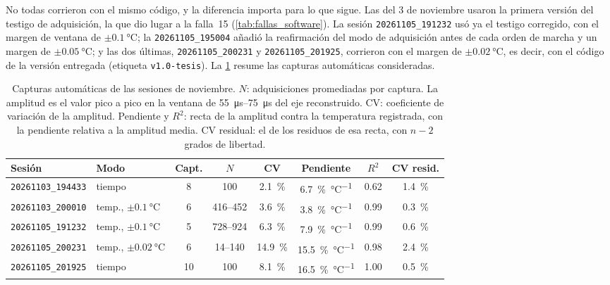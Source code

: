 No todas corrieron con el mismo código, y la diferencia importa para
lo que sigue. Las del 3 de noviembre usaron la primera versión del
testigo de adquisición, la que dio lugar a la falla~15
(\cref{tab:fallas_software}). La sesión \texttt{20261105\_191232} usó
ya el testigo corregido, con el margen de ventana de
$\pm\SI{0.1}{\celsius}$; la \texttt{20261105\_195004} añadió la
reafirmación del modo de adquisición antes de cada orden de marcha y
un margen de $\pm\SI{0.05}{\celsius}$; y las dos últimas,
\texttt{20261105\_200231} y \texttt{20261105\_201925}, corrieron con el
margen de $\pm\SI{0.02}{\celsius}$, es decir, con el código de la
versión entregada (etiqueta \texttt{v1.0-tesis}). La
\cref{tab:sesiones_congeladas} resume las capturas automáticas
consideradas.

\begin{table}[htbp]
  \centering
  \caption{Capturas automáticas de las sesiones de noviembre. $N$:
    adquisiciones promediadas por captura. La amplitud es el valor pico a
    pico en la ventana de \SIrange{55}{75}{\micro\second} del eje
    reconstruido. CV: coeficiente de variación de la amplitud. Pendiente
    y $R^2$: recta de la amplitud contra la temperatura registrada,
    con la pendiente relativa a la amplitud media. CV residual: el de los
    residuos de esa recta, con $n-2$ grados de libertad.}
  \label{tab:sesiones_congeladas}
  \small
  \setlength{\tabcolsep}{3.5pt}
  \begin{tabular}{l l c c c c c c}
    \toprule
    Sesión & Modo & Capt. & $N$ & CV & Pendiente & $R^2$ & CV resid. \\
    \midrule
    \texttt{20261103\_194433} & tiempo & 8 & 100 &
      \SI{2.1}{\percent} & \SI{6.7}{\percent\per\celsius} & 0.62 & \SI{1.4}{\percent} \\
    \texttt{20261103\_200010} & temp., $\pm\SI{0.1}{\celsius}$ & 6 & 416--452 &
      \SI{3.6}{\percent} & \SI{3.8}{\percent\per\celsius} & 0.99 & \SI{0.3}{\percent} \\
    \texttt{20261105\_191232} & temp., $\pm\SI{0.1}{\celsius}$ & 5 & 728--924 &
      \SI{6.3}{\percent} & \SI{7.9}{\percent\per\celsius} & 0.99 & \SI{0.6}{\percent} \\
    \texttt{20261105\_200231} & temp., $\pm\SI{0.02}{\celsius}$ & 6 & 14--140 &
      \SI{14.9}{\percent} & \SI{15.5}{\percent\per\celsius} & 0.98 & \SI{2.4}{\percent} \\
    \texttt{20261105\_201925} & tiempo & 10 & 100 &
      \SI{8.1}{\percent} & \SI{16.5}{\percent\per\celsius} & 1.00 & \SI{0.5}{\percent} \\
    \bottomrule
  \end{tabular}
\end{table}

